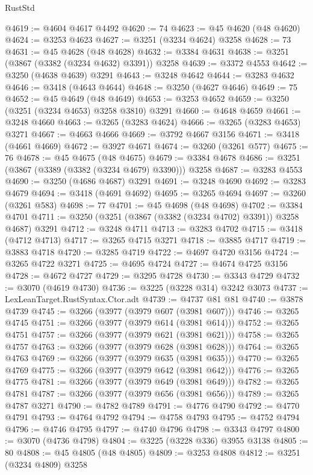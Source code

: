 \begin{lexlean}{RustStd}
\begin{coremodule}
@4619 := @4604 @4617 @4492
@4620 := 74
@4623 := @45 @4620 (@48 @4620)
@4624 := @3253 @4623
@4627 := @3251 (@3234 @4624) @3258
@4628 := 73
@4631 := @45 @4628 (@48 @4628)
@4632 := @3384 @4631
@4638 := @3251 (@3867 (@3382 (@3234 @4632) @3391)) @3258
@4639 := @3372 @4553
@4642 := @3250 (@4638 @4639) @3291
@4643 := @3248 @4642
@4644 := @3283 @4632
@4646 := @3418 (@4643 @4644)
@4648 := @3250 (@4627 @4646)
@4649 := 75
@4652 := @45 @4649 (@48 @4649)
@4653 := @3253 @4652
@4659 := @3250 (@3251 (@3234 @4653) @3258 @3810) @3291
@4660 := @4648 @4659
@4661 := @3248 @4660
@4663 := @3265 (@3283 @4624)
@4666 := @3265 (@3283 @4653) @3271
@4667 := @4663 @4666
@4669 := @3792 @4667 @3156
@4671 := @3418 (@4661 @4669)
@4672 := @3927 @4671
@4674 := @3260 (@3261 @577)
@4675 := 76
@4678 := @45 @4675 (@48 @4675)
@4679 := @3384 @4678
@4686 := @3251 (@3867 (@3389 (@3382 (@3234 @4679) @3390))) @3258
@4687 := @3283 @4553
@4690 := @3250 (@4686 @4687) @3291
@4691 := @3248 @4690
@4692 := @3283 @4679
@4694 := @3418 (@4691 @4692)
@4695 := @3265 @4694
@4697 := @3260 (@3261 @583)
@4698 := 77
@4701 := @45 @4698 (@48 @4698)
@4702 := @3384 @4701
@4711 := @3250 (@3251 (@3867 (@3382 (@3234 @4702) @3391)) @3258 @4687) @3291
@4712 := @3248 @4711
@4713 := @3283 @4702
@4715 := @3418 (@4712 @4713)
@4717 := @3265 @4715 @3271
@4718 := @3885 @4717
@4719 := @3883 @4718
@4720 := @3285 @4719
@4722 := @4697 @4720 @3156
@4724 := @3265 @4722 @3271
@4725 := @4695 @4724
@4727 := @4674 @4725 @3156
@4728 := @4672 @4727
@4729 := @3295 @4728
@4730 := @3343 @4729
@4732 := @3070 (@4619 @4730)
@4736 := @3225 (@3228 @314) @3242 @3073
@4737 := LexLeanTarget.RustSyntax.Ctor.adt
@4739 := @4737 @81 @81
@4740 := @3878 @4739
@4745 := @3266 (@3977 (@3979 @607 (@3981 @607)))
@4746 := @3265 @4745
@4751 := @3266 (@3977 (@3979 @614 (@3981 @614)))
@4752 := @3265 @4751
@4757 := @3266 (@3977 (@3979 @621 (@3981 @621)))
@4758 := @3265 @4757
@4763 := @3266 (@3977 (@3979 @628 (@3981 @628)))
@4764 := @3265 @4763
@4769 := @3266 (@3977 (@3979 @635 (@3981 @635)))
@4770 := @3265 @4769
@4775 := @3266 (@3977 (@3979 @642 (@3981 @642)))
@4776 := @3265 @4775
@4781 := @3266 (@3977 (@3979 @649 (@3981 @649)))
@4782 := @3265 @4781
@4787 := @3266 (@3977 (@3979 @656 (@3981 @656)))
@4789 := @3265 @4787 @3271
@4790 := @4782 @4789
@4791 := @4776 @4790
@4792 := @4770 @4791
@4793 := @4764 @4792
@4794 := @4758 @4793
@4795 := @4752 @4794
@4796 := @4746 @4795
@4797 := @4740 @4796
@4798 := @3343 @4797
@4800 := @3070 (@4736 @4798)
@4804 := @3225 (@3228 @336) @3955 @3138
@4805 := 80
@4808 := @45 @4805 (@48 @4805)
@4809 := @3253 @4808
@4812 := @3251 (@3234 @4809) @3258

\end{coremodule}
\end{lexlean}
